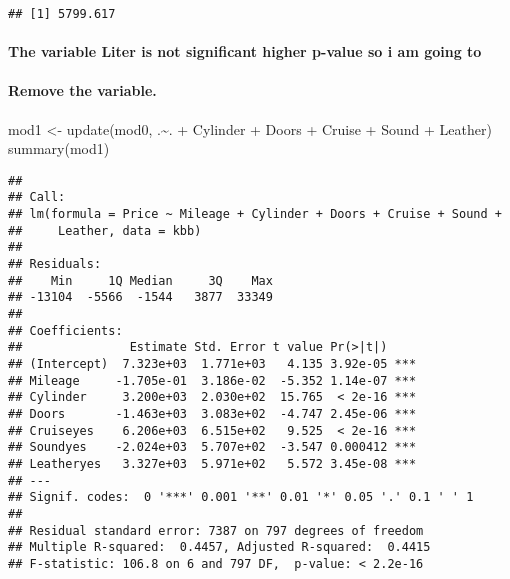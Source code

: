 \documentclass[
]{article}
\newenvironment{Shaded}{\begin{snugshade}}{\end{snugshade}}
\newcommand{\FunctionTok}[1]{\textcolor[rgb]{0.00,0.00,0.00}{#1}}
\newcommand{\NormalTok}[1]{#1}
\newcommand{\OtherTok}[1]{\textcolor[rgb]{0.56,0.35,0.01}{#1}}
\newcommand{\SpecialCharTok}[1]{\textcolor[rgb]{0.00,0.00,0.00}{#1}}
\begin{document}
\begin{verbatim}
## [1] 5799.617
\end{verbatim}

\hypertarget{the-variable-liter-is-not-significant-higher-p-value-so-i-am-going-to}{%
\paragraph{The variable Liter is not significant higher p-value so i am
going
to}\label{the-variable-liter-is-not-significant-higher-p-value-so-i-am-going-to}}

\hypertarget{remove-the-variable.}{%
\paragraph{Remove the variable.}\label{remove-the-variable.}}

\begin{Shaded}
\begin{Highlighting}[]
\NormalTok{mod1 }\OtherTok{\textless{}{-}} \FunctionTok{update}\NormalTok{(mod0, .}\SpecialCharTok{\textasciitilde{}}\NormalTok{. }\SpecialCharTok{+}\NormalTok{ Cylinder }\SpecialCharTok{+}\NormalTok{ Doors }\SpecialCharTok{+}\NormalTok{ Cruise }\SpecialCharTok{+}\NormalTok{ Sound }\SpecialCharTok{+}\NormalTok{ Leather)}
\FunctionTok{summary}\NormalTok{(mod1)}
\end{Highlighting}
\end{Shaded}

\begin{verbatim}
## 
## Call:
## lm(formula = Price ~ Mileage + Cylinder + Doors + Cruise + Sound + 
##     Leather, data = kbb)
## 
## Residuals:
##    Min     1Q Median     3Q    Max 
## -13104  -5566  -1544   3877  33349 
## 
## Coefficients:
##               Estimate Std. Error t value Pr(>|t|)    
## (Intercept)  7.323e+03  1.771e+03   4.135 3.92e-05 ***
## Mileage     -1.705e-01  3.186e-02  -5.352 1.14e-07 ***
## Cylinder     3.200e+03  2.030e+02  15.765  < 2e-16 ***
## Doors       -1.463e+03  3.083e+02  -4.747 2.45e-06 ***
## Cruiseyes    6.206e+03  6.515e+02   9.525  < 2e-16 ***
## Soundyes    -2.024e+03  5.707e+02  -3.547 0.000412 ***
## Leatheryes   3.327e+03  5.971e+02   5.572 3.45e-08 ***
## ---
## Signif. codes:  0 '***' 0.001 '**' 0.01 '*' 0.05 '.' 0.1 ' ' 1
## 
## Residual standard error: 7387 on 797 degrees of freedom
## Multiple R-squared:  0.4457, Adjusted R-squared:  0.4415 
## F-statistic: 106.8 on 6 and 797 DF,  p-value: < 2.2e-16
\end{verbatim}
\end{document}

